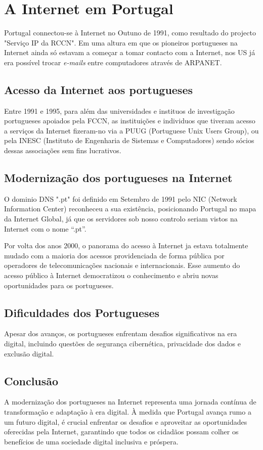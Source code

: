 \section{A Internet em Portugal}
\label{sec:portugalcase}

Portugal connectou-se à Internet no Outuno de 1991, como resultado do projecto "Serviço IP 
da RCCN". Em uma altura em que os pioneiros portugueses na Internet ainda só estavam a 
começar a tomar contacto com a Internet, nos US já era possível trocar \textit{e-mails}
entre computadores através de ARPANET.

\subsection{Acesso da Internet aos portugueses}
Entre 1991 e 1995, para além das universidades e instituos de investigação portugueses 
apoiados pela FCCN, as instituições e individuos que tiveram acesso a serviços da Internet
fizeram-no via a PUUG (Portuguese Unix Users Group), ou pela INESC (Instituto de Engenharia
de Sistemas e Computadores) sendo sócios dessas associações sem fins lucrativos.

\subsection{Modernização dos portugueses na Internet}
O dominio DNS ".pt" foi definido em Setembro de 1991 pelo NIC (Network Information Center)
reconheceu a sua existência, posicionando Portugal no mapa da Internet Global, já que  
os servidores sob nosso controlo seriam vistos na Internet com o nome “.pt”.

Por volta dos anos 2000, o panorama do acesso à Internet ja estava totalmente mudado com a 
maioria dos acessos providenciada de forma pública por operadores de telecomunicações
nacionais e internacionais. Esse aumento do acesso público à Internet democratizou o 
conhecimento e abriu novas oportunidades para os portugueses.

\subsection{Dificuldades dos Portugueses}
Apesar dos avanços, os portugueses enfrentam desafios significativos na era digital, 
incluindo questões de segurança cibernética, privacidade dos dados e exclusão digital. 

\subsection{Conclusão}
A modernização dos portugueses na Internet representa uma jornada contínua de 
transformação e adaptação à era digital. À medida que Portugal avança rumo a um 
futuro digital, é crucial enfrentar os desafios e aproveitar as oportunidades 
oferecidas pela Internet, garantindo que todos os cidadãos possam colher os benefícios 
de uma sociedade digital inclusiva e próspera.

